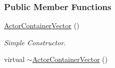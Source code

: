 \subsubsection*{Public Member Functions}
\begin{DoxyCompactItemize}
\item 
\hyperlink{classMezzanine_1_1ActorContainerVector_a20cb603431e4499c1c6d3c901493f224}{ActorContainerVector} ()
\begin{DoxyCompactList}\small\item\em Simple Constructor. \item\end{DoxyCompactList}\item 
\hypertarget{classMezzanine_1_1ActorContainerVector_a84a9f721addd5bdfbc611393913e68fd}{
virtual \hyperlink{classMezzanine_1_1ActorContainerVector_a84a9f721addd5bdfbc611393913e68fd}{$\sim$ActorContainerVector} ()}
\label{classMezzanine_1_1ActorContainerVector_a84a9f721addd5bdfbc611393913e68fd}


\end{DoxyCompactItemize}
